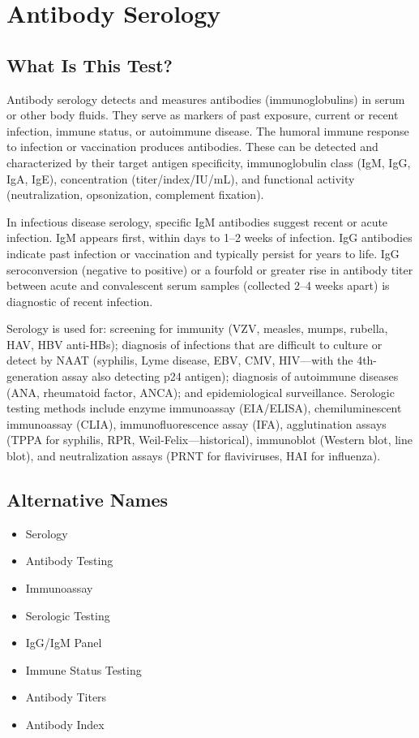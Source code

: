 \chapter{Antibody Serology}

\section*{What Is This Test?}
Antibody serology detects and measures antibodies (immunoglobulins) in serum or other body fluids. They serve as markers of past exposure, current or recent infection, immune status, or autoimmune disease. The humoral immune response to infection or vaccination produces antibodies. These can be detected and characterized by their target antigen specificity, immunoglobulin class (IgM, IgG, IgA, IgE), concentration (titer/index/IU/mL), and functional activity (neutralization, opsonization, complement fixation).

In infectious disease serology, specific IgM antibodies suggest recent or acute infection. IgM appears first, within days to 1--2 weeks of infection. IgG antibodies indicate past infection or vaccination and typically persist for years to life. IgG seroconversion (negative to positive) or a fourfold or greater rise in antibody titer between acute and convalescent serum samples (collected 2--4 weeks apart) is diagnostic of recent infection.

Serology is used for: screening for immunity (VZV, measles, mumps, rubella, HAV, HBV anti-HBs); diagnosis of infections that are difficult to culture or detect by NAAT (syphilis, Lyme disease, EBV, CMV, HIV---with the 4th-generation assay also detecting p24 antigen); diagnosis of autoimmune diseases (ANA, rheumatoid factor, ANCA); and epidemiological surveillance. Serologic testing methods include enzyme immunoassay (EIA/ELISA), chemiluminescent immunoassay (CLIA), immunofluorescence assay (IFA), agglutination assays (TPPA for syphilis, RPR, Weil-Felix---historical), immunoblot (Western blot, line blot), and neutralization assays (PRNT for flaviviruses, HAI for influenza).

\section*{Alternative Names}
\begin{itemize}
  \item Serology
  \item Antibody Testing
  \item Immunoassay
  \item Serologic Testing
  \item IgG/IgM Panel
  \item Immune Status Testing
  \item Antibody Titers
  \item Antibody Index
\end{itemize}
